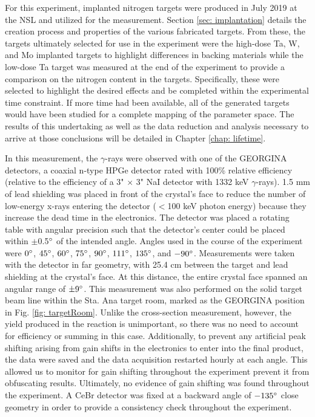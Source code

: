 For this experiment, implanted nitrogen targets were produced in July 2019 at the NSL and utilized for the measurement. Section \ref{sec: implantation} details the creation process and properties of the various fabricated targets. From these, the targets ultimately selected for use in the experiment were the high-dose Ta, W, and Mo implanted targets to highlight differences in backing materials while the low-dose Ta target was measured at the end of the experiment to provide a comparison on the nitrogen content in the targets. Specifically, these were selected to highlight the desired effects and be completed within the experimental time constraint. If more time had been available, all of the generated targets would have been studied for a complete mapping of the parameter space. The results of this undertaking as well as the data reduction and analysis necessary to arrive at those conclusions will be detailed in Chapter \ref{chap: lifetime}.

In this measurement, the $\gamma$-rays were observed with one of the GEORGINA detectors, a coaxial n-type HPGe detector rated with 100\% relative efficiency (relative to the efficiency of a 3" $\times$ 3" NaI detector with 1332 keV $\gamma$-rays). 1.5 mm of lead shielding was placed in front of the crystal's face to reduce the number of low-energy x-rays entering the detector ($<$100 keV photon energy) because they increase the dead time in the electronics. The detector was placed a rotating table with angular precision such that the detector's center could be placed within $\pm$0.5$\degree$ of the intended angle. Angles used in the course of the experiment were $0\degree$, $45\degree$, $60\degree$, $75\degree$, $90\degree$, $111\degree$, $135\degree$, and $-90\degree$. Measurements were taken with the detector in far geometry, with 25.4 cm between the target and lead shielding at the crystal's face. At this distance, the entire crystal face spanned an angular range of $\pm9\degree$. This measurement was also performed on the solid target beam line within the Sta. Ana target room, marked as the GEORGINA position in Fig. \ref{fig: targetRoom}. Unlike the cross-section measurement, however, the yield produced in the reaction is unimportant, so there was no need to account for efficiency or summing in this case. Additionally, to prevent any artificial peak shifting arising from gain shifts in the electronics to enter into the final product, the data were saved and the data acquisition restarted hourly at each angle. This allowed us to monitor for gain shifting throughout the experiment prevent it from obfuscating results. Ultimately, no evidence of gain shifting was found throughout the experiment. A CeBr detector was fixed at a backward angle of $-135\degree$ close geometry in order to provide a consistency check throughout the experiment.

